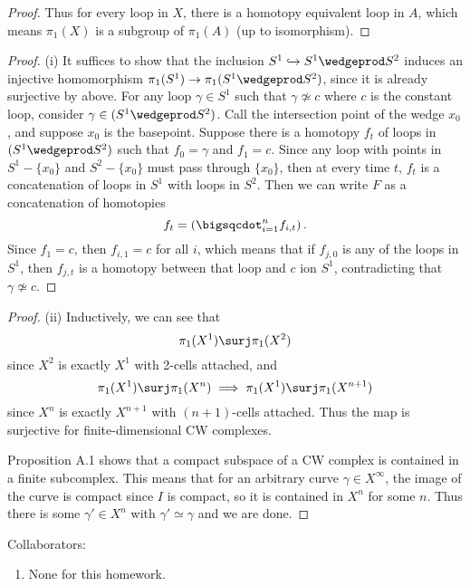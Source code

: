 \documentclass[12pt,letterpaper]{article}
\begin{document}
\begin{enumerate}
\begin{proof}
Thus for every loop in $X$, there is a homotopy equivalent loop in $A$, which means $\pi_1(X)$ is a subgroup of $\pi_1(A)$ (up to isomorphism). 
\qedwhitehere 
\end{proof}
\begin{proof}(i)
It suffices to show that the inclusion $S^1\hookrightarrow S^1\wedgeprod S^2$ induces an injective homomorphism $\pi_1(S^1)\to\pi_1(S^1\wedgeprod S^2)$, since it is already surjective by above. For any loop $\gamma\in S^1$ such that $\gamma\not\simeq c$ where $c$ is the constant loop, consider $\gamma\in (S^1\wedgeprod S^2)$. Call the intersection point of the wedge $x_0$, and \Wlog{} suppose $x_0$ is the basepoint. Suppose there is a homotopy $f_t$ of loops in $(S^1\wedgeprod S^2)$ such that $f_0=\gamma$ and $f_1=c$.  Since any loop with points in $S^1-\{x_0\}$ and $S^2-\{x_0\}$ must pass through $\{x_0\}$, then at every time $t$, $f_t$ is a concatenation of loops in $S^1$ with loops in $S^2$. Then we can write $F$ as a concatenation of homotopies 
$$f_t=\left(\bigsqcdot_{i=1}^n f_{i,t}\right). $$
Since $f_1=c$, then $f_{i,1}=c$ for all $i$, which means that if $f_{j,0}$ is any of the loops in $S^1$, then $f_{j,t}$ is a homotopy between that loop and $c$ ion $S^1$, contradicting that $\gamma\not\simeq c$. \qedwhitehere
\end{proof}
\begin{proof}(ii)
Inductively, we can see that 
$$\pi_1(X^1)\surj \pi_1(X^2)$$ 
since $X^2$ is exactly $X^1$ with 2-cells attached, and 
$$\pi_1(X^1)\surj \pi_1(X^n)\implies \pi_1(X^1)\surj \pi_1(X^{n+1})$$ 
since $X^n$ is exactly $X^{n+1}$ with $(n+1)$-cells attached. Thus the map is surjective for finite-dimensional CW complexes. 

Proposition A.1 shows that a compact subspace of a CW complex is contained in a finite subcomplex. This means that for an arbitrary curve $\gamma\in X^\infty$, the image of the curve is compact since $I$ is compact, so it is contained in $X^n$ for some $n$. Thus there is some $\gamma'\in X^n$ with $\gamma'\simeq\gamma	$ and we are done. 
\end{proof}
\end{enumerate}
\vfill

Collaborators:
\begin{enumerate}
\item[] None for this homework.
\end{enumerate}
\end{document}
